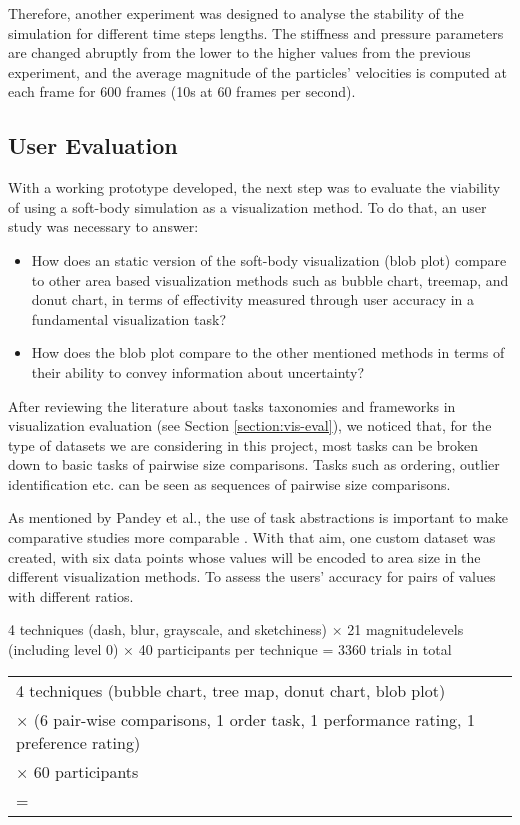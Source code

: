 \documentclass[manuscript, screen]{timtm}
\begin{document}
Therefore, another experiment was designed to analyse the stability of the simulation for different time steps lengths. The stiffness and pressure parameters are changed abruptly from the lower to the higher values from the previous experiment, and the average magnitude of the particles' velocities is computed at each frame for 600 frames (10s at 60 frames per second).

\subsection{User Evaluation}

With a working prototype developed, the next step was to evaluate the viability of using a soft-body simulation as a visualization method. To do that, an user study was necessary to answer:

\begin{itemize}
    \item How does an static version of the soft-body visualization (blob plot) compare to other area based visualization methods such as bubble chart, treemap, and donut chart, in terms of effectivity measured through user accuracy in a fundamental visualization task?
    \item How does the blob plot compare to the other mentioned methods in terms of their ability to convey information about uncertainty?
\end{itemize}

After reviewing the literature about tasks taxonomies and frameworks in visualization evaluation (see Section \ref{section:vis-eval}), we noticed that, for the type of datasets we are considering in this project, most tasks can be broken down to basic tasks of pairwise size comparisons. Tasks such as ordering, outlier identification etc. can be seen as sequences of pairwise size comparisons. 

As mentioned by Pandey et al., the use of task abstractions is important to make comparative studies more comparable \cite{pandey2020towards}. With that aim, one custom dataset was created, with six data points whose values will be encoded to area size in the different visualization methods. To assess the users' accuracy for pairs of values with different ratios.

4 techniques (dash, blur, grayscale, and sketchiness) × 21 magnitudelevels (including level 0) × 40 participants per technique = 3360 trials in total

\begin{table}
  \begin{tabular}{l}
    4 techniques (bubble chart, tree map, donut chart, blob plot)\\
    × (6 pair-wise comparisons, 1 order task, 1 performance rating, 1 preference rating)\\
    × 60 participants\\
    = \\
\end{tabular}
\end{table}
\end{document}
